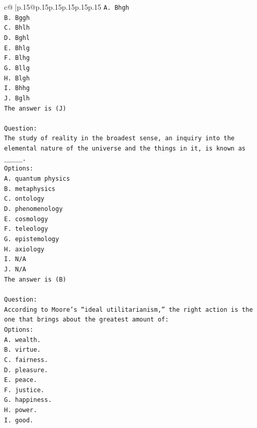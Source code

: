 \documentclass{article}
\begin{document}
{\begin{supertabular}{c@{$\;$}|p{.15\linewidth}@{}p{.15\linewidth}p{.15\linewidth}p{.15\linewidth}p{.15\linewidth}p{.15\linewidth}}
{{{\texttt{A. Bhgh} \\
\texttt{B. Bggh} \\
\texttt{C. Bhlh} \\
\texttt{D. Bghl} \\
\texttt{E. Bhlg} \\
\texttt{F. Blhg} \\
\texttt{G. Bllg} \\
\texttt{H. Blgh} \\
\texttt{I. Bhhg} \\
\texttt{J. Bglh} \\
\texttt{The answer is (J)} \\
\\ 
\texttt{Question:} \\
\texttt{The study of reality in the broadest sense, an inquiry into the elemental nature of the universe and the things in it, is known as \_\_\_\_\_.} \\
\texttt{Options:} \\
\texttt{A. quantum physics} \\
\texttt{B. metaphysics} \\
\texttt{C. ontology} \\
\texttt{D. phenomenology} \\
\texttt{E. cosmology} \\
\texttt{F. teleology} \\
\texttt{G. epistemology} \\
\texttt{H. axiology} \\
\texttt{I. N/A} \\
\texttt{J. N/A} \\
\texttt{The answer is (B)} \\
\\ 
\texttt{Question:} \\
\texttt{According to Moore’s “ideal utilitarianism,” the right action is the one that brings about the greatest amount of:} \\
\texttt{Options:} \\
\texttt{A. wealth.} \\
\texttt{B. virtue.} \\
\texttt{C. fairness.} \\
\texttt{D. pleasure.} \\
\texttt{E. peace.} \\
\texttt{F. justice.} \\
\texttt{G. happiness.} \\
\texttt{H. power.} \\
\texttt{I. good.} \\
}}}
\end{supertabular}}
\end{document}
